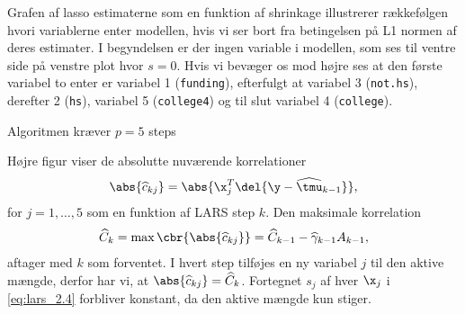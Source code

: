 Grafen af lasso estimaterne som en funktion af shrinkage illustrerer rækkefølgen hvori variablerne enter modellen, hvis vi ser bort fra betingelsen på L1 normen af deres estimater.
I begyndelsen er der ingen variable i modellen, som ses til ventre side på venstre plot hvor \(s=0\).
Hvis vi bevæger os mod højre ses at den første variabel to enter er variabel 1 (\texttt{funding}), efterfulgt at variabel 3 (\texttt{not.hs}), derefter 2 (\texttt{hs}), variabel 5 (\texttt{college4}) og til slut variabel 4 (\texttt{college}). 

Algoritmen kræver \(p=5\) steps 

Højre figur viser de absolutte nuværende korrelationer
\begin{align*}
\abs{\widehat{c}_{kj}} = \abs{\x_j^T \del{\y - \widehat{\tmu}_{k-1}}},
\end{align*}
for \(j = 1, \ldots, 5\) som en funktion af LARS step \(k\).
Den maksimale korrelation
\begin{align*}
\widehat{C}_k = \max \cbr{\abs{\widehat{c}_{kj}}} = \widehat{C}_{k-1} - \widehat{\gamma}_{k-1} A_{k-1},
\end{align*}
aftager med \(k\) som forventet.
I hvert step tilføjes en ny variabel \(j\) til den aktive mængde, derfor har vi, at \(\abs{\widehat{c}_{kj}} = \widehat{C}_k\).
Fortegnet \(s_j\) af hver \(\x_j\) i \eqref{eq:lars_2.4} forbliver konstant, da den aktive mængde kun stiger.

